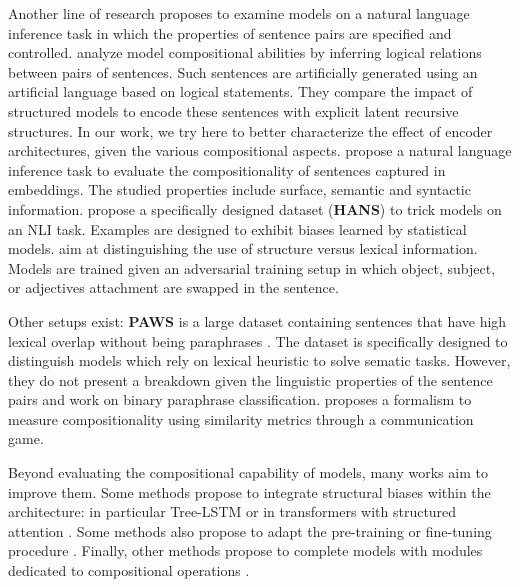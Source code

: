 Another line of research proposes to examine models on a natural language inference task in which the properties of sentence pairs are specified and controlled. 
\textcite{bowman_15} analyze model compositional abilities by inferring logical relations between pairs of sentences. Such sentences are artificially generated using an artificial language based on logical statements. They compare the impact of structured models to encode these sentences with explicit latent recursive structures. In our work, we try here to better characterize the effect of encoder architectures, given the various compositional aspects.
\textcite{dasgupta_18} propose a natural language inference task to evaluate the compositionality of sentences captured in embeddings. The studied properties include surface, semantic and syntactic information. %
\textcite{mccoy_19} propose a specifically designed dataset (\textbf{HANS}) to trick models on an NLI task. Examples are designed to exhibit biases learned by statistical models. 
\textcite{nie_19} aim at distinguishing the use of structure versus lexical information. Models are trained given an adversarial training setup in which object, subject, or adjectives attachment are swapped in the sentence.

Other setups exist: \textbf{PAWS} is a large dataset containing sentences that have high lexical overlap without being paraphrases \parencite{zhang_19}. The dataset is specifically designed to distinguish models which rely on lexical heuristic to solve sematic tasks. However, they do not present a breakdown given the linguistic properties of the sentence pairs and work on binary paraphrase classification. \textcite{andreas_19} proposes a formalism to measure compositionality using similarity metrics through a communication game.

Beyond evaluating the compositional capability of models, many works aim to improve them. Some methods propose to integrate structural biases within the architecture: in particular Tree-LSTM \parencite{tai_15} or in transformers with structured attention \parencite{russin_19}. Some methods also propose to adapt the pre-training or fine-tuning procedure \parencite{furrer_20}. Finally, other methods propose to complete models with modules dedicated to compositional operations \parencite{liu_20, onta_21}.

